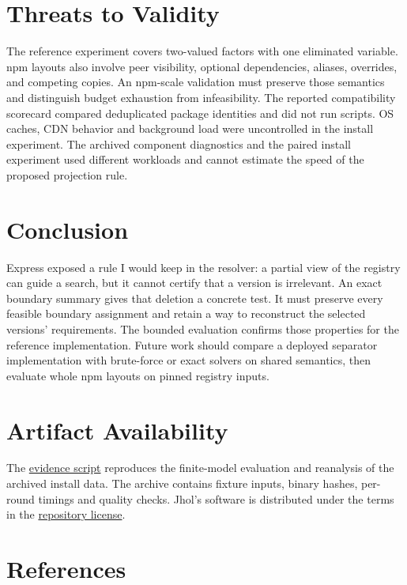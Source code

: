 \documentclass[
  11pt,
  letterpaper,
]{article}
\begin{document}
\section{Threats to Validity}\label{threats-to-validity}

The reference experiment covers two-valued factors with one eliminated
variable. npm layouts also involve peer visibility, optional
dependencies, aliases, overrides, and competing copies. An npm-scale
validation must preserve those semantics and distinguish budget
exhaustion from infeasibility. The reported compatibility scorecard
compared deduplicated package identities and did not run scripts. OS
caches, CDN behavior and background load were uncontrolled in the
install experiment. The archived component diagnostics and the paired
install experiment used different workloads and cannot estimate the
speed of the proposed projection rule.

\section{Conclusion}\label{conclusion}

Express exposed a rule I would keep in the resolver: a partial view of
the registry can guide a search, but it cannot certify that a version is
irrelevant. An exact boundary summary gives that deletion a concrete
test. It must preserve every feasible boundary assignment and retain a
way to reconstruct the selected versions' requirements. The bounded
evaluation confirms those properties for the reference implementation.
Future work should compare a deployed separator implementation with
brute-force or exact solvers on shared semantics, then evaluate whole
npm layouts on pinned registry inputs.

\section*{Artifact Availability}\label{artifact-availability}

The \href{../../scripts/bench/paper_evidence.py}{evidence script}
reproduces the finite-model evaluation and reanalysis of the archived
install data. The archive contains fixture inputs, binary hashes,
per-round timings and quality checks. Jhol's software is distributed
under the terms in the \href{../../LICENSE}{repository license}.

\section*{References}\label{references}
\end{document}
